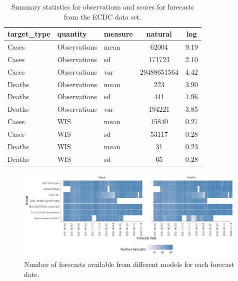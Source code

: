 \documentclass{article}
\begin{document}
\begin{table}[h!]
    \centering


\begin{tabular}{lllcc}
\toprule
target\_type & quantity & measure & natural & log\\
\midrule
Cases & Observations & mean & 62004 & 9.19\\
Cases & Observations & sd & 171723 & 2.10\\
Cases & Observations & var & 29488651564 & 4.42\\
\addlinespace
Deaths & Observations & mean & 223 & 3.90\\
Deaths & Observations & sd & 441 & 1.96\\
Deaths & Observations & var & 194221 & 3.85\\
\addlinespace
\hline
\addlinespace
Cases & WIS & mean & 15840 & 0.27\\
Cases & WIS & sd & 53117 & 0.28\\
\addlinespace
Deaths & WIS & mean & 31 & 0.23\\
Deaths & WIS & sd & 65 & 0.28\\
\bottomrule
\end{tabular}
    \caption{Summary statistics for observations and scores for forecasts from the ECDC data set.}
    \label{tab:HUB-summary}
\end{table}

\begin{figure}[h!]
    \centering
    \includegraphics[width=0.99\textwidth]{output/figures/number-avail-forecasts.png}
    \caption{
    Number of forecasts available from different models for each forecast date. 
    }
    \label{fig:HUB-num-avail-models}
\end{figure}
\end{document}
